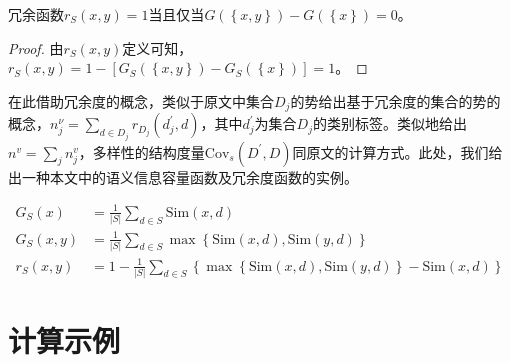 \documentclass{../notes}
\newcommand{\Cov}{\text{Cov}}
\newcommand{\Sim}{\text{Sim}}
\begin{document}
    \begin{proposition}
        冗余函数$r_S\left(x,y\right)=1$当且仅当$G\left(\left\{x,y\right\}\right)-G\left(\left\{x\right\}\right)=0$。
    \end{proposition}

    \begin{proof}
        由$r_S\left(x,y\right)$定义可知，$r_S\left(x,y\right)=1-\left[G_S\left(\left\{x,y\right\}\right)-G_S\left(\left\{x\right\}\right)\right]=1$。
    \end{proof}

    在此借助冗余度的概念，类似于原文中集合$D_j$的势给出基于冗余度的集合的势的概念，$n_j^\nu=\sum_{d\in D_j}{r_{D_j}(d_j^\prime,d)}$，其中$d_j^\prime$为集合$D_j$的类别标签。类似地给出$n^v=\sum_{j} n_j^v$，多样性的结构度量$\Cov_s(D^\prime,D)$同原文的计算方式。此处，我们给出一种本文中的语义信息容量函数及冗余度函数的实例。

    \begin{align}
        G_S({x})&=\frac{1}{|S|}\sum_{d\in S}{\Sim(x,d)} \\
        G_S({x,y})&=\frac{1}{|S|}\sum_{d\in S}\max\left\{\Sim(x,d),\Sim(y,d)\right\} \\
        r_S\left(x,y\right)&=1-\frac{1}{\left|S\right|}\sum_{d\in S}\left\{\max\left\{\Sim\left(x,d\right),\Sim\left(y,d\right)\right\}-\Sim\left(x,d\right)\right\} \label{eq:4}
    \end{align}

    \section{计算示例}
\end{document}
